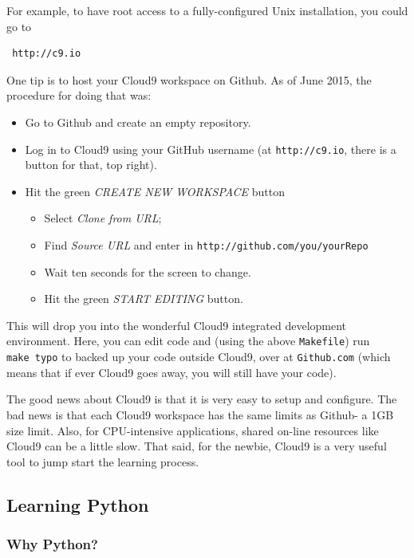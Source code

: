 For example, to have root access to a fully-configured Unix
installation, you could go to

\begin{lstlisting}
 http://c9.io
\end{lstlisting}

One tip is to host your Cloud9 workspace on Github. As of June 2015, the
procedure for doing that was:

\begin{itemize}
\itemsep1pt\parskip0pt
\item
  Go to Github and create an empty repository.
\item
  Log in to Cloud9 using your GitHub username (at \texttt{http://c9.io},
  there is a button for that, top right).
\item
  Hit the green \emph{CREATE NEW WORKSPACE} button

  \begin{itemize}
  \itemsep1pt\parskip0pt
  \item
    Select \emph{Clone from URL};
  \item
    Find \emph{Source URL} and enter in
    \texttt{http://github.com/you/yourRepo}
  \item
    Wait ten seconds for the screen to change.
  \item
    Hit the green \emph{START EDITING} button.
  \end{itemize}
\end{itemize}

This will drop you into the wonderful Cloud9 integrated development
environment. Here, you can edit code and (using the above
\texttt{Makefile}) run \texttt{make\ typo} to backed up your code
outside Cloud9, over at \texttt{Github.com} (which means that if ever
Cloud9 goes away, you will still have your code).

The good news about Cloud9 is that it is very easy to setup and
configure. The bad news is that each Cloud9 workspace has the same
limits as Github- a 1GB size limit. Also, for CPU-intensive
applications, shared on-line resources like Cloud9 can be a little slow.
That said, for the newbie, Cloud9 is a very useful tool to jump start
the learning process.

\subsection{Learning Python}\label{learning-python}

\subsubsection{Why Python?}\label{why-python}

